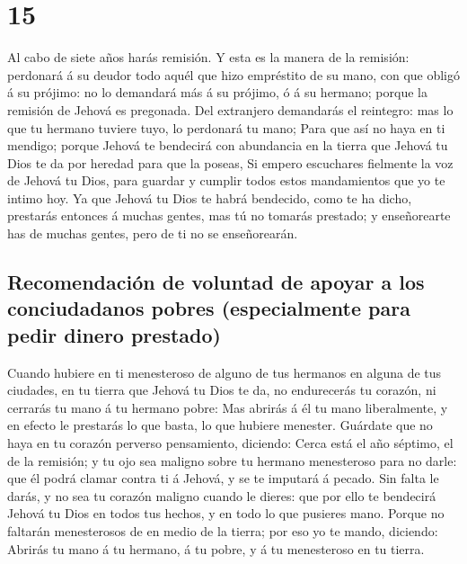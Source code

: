 \hypertarget{section-05-15}{%
\section{15}\label{section-05-15}}

 Al cabo de siete años harás remisión.  Y
esta es la manera de la remisión: perdonará á su deudor todo aquél que
hizo empréstito de su mano, con que obligó á su prójimo: no lo demandará
más á su prójimo, ó á su hermano; porque la remisión de Jehová es
pregonada.  Del extranjero demandarás el reintegro: mas lo
que tu hermano tuviere tuyo, lo perdonará tu mano;  Para
que así no haya en ti mendigo; porque Jehová te bendecirá con abundancia
en la tierra que Jehová tu Dios te da por heredad para que la poseas,
 Si empero escuchares fielmente la voz de Jehová tu Dios,
para guardar y cumplir todos estos mandamientos que yo te intimo hoy.
 Ya que Jehová tu Dios te habrá bendecido, como te ha
dicho, prestarás entonces á muchas gentes, mas tú no tomarás prestado; y
enseñorearte has de muchas gentes, pero de ti no se enseñorearán.

\hypertarget{recomendaciuxf3n-de-voluntad-de-apoyar-a-los-conciudadanos-pobres-especialmente-para-pedir-dinero-prestado}{%
\subsection{Recomendación de voluntad de apoyar a los conciudadanos
pobres (especialmente para pedir dinero
prestado)}\label{recomendaciuxf3n-de-voluntad-de-apoyar-a-los-conciudadanos-pobres-especialmente-para-pedir-dinero-prestado}}

 Cuando hubiere en ti menesteroso de alguno de tus
hermanos en alguna de tus ciudades, en tu tierra que Jehová tu Dios te
da, no endurecerás tu corazón, ni cerrarás tu mano á tu hermano pobre:
 Mas abrirás á él tu mano liberalmente, y en efecto le
prestarás lo que basta, lo que hubiere menester.  Guárdate
que no haya en tu corazón perverso pensamiento, diciendo: Cerca está el
año séptimo, el de la remisión; y tu ojo sea maligno sobre tu hermano
menesteroso para no darle: que él podrá clamar contra ti á Jehová, y se
te imputará á pecado.  Sin falta le darás, y no sea tu
corazón maligno cuando le dieres: que por ello te bendecirá Jehová tu
Dios en todos tus hechos, y en todo lo que pusieres mano.
 Porque no faltarán menesterosos de en medio de la
tierra; por eso yo te mando, diciendo: Abrirás tu mano á tu hermano, á
tu pobre, y á tu menesteroso en tu tierra.

